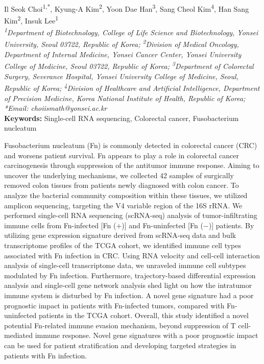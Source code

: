 \begin{center}
Il Seok Choi\textsuperscript{1,*}, Kyung-A Kim\textsuperscript{2}, Yoon Dae Han\textsuperscript{3}, Sang Cheol Kim\textsuperscript{4}, Han Sang Kim\textsuperscript{2}, Insuk Lee\textsuperscript{1} \\
\vspace{0.2cm}
\textit{\textsuperscript{1}Department of Biotechnology, College of Life Science and Biotechnology, Yonsei University, Seoul 03722, Republic of Korea; \textsuperscript{2}Division of Medical Oncology, Department of Internal Medicine, Yonsei Cancer Center, Yonsei University College of Medicine, Seoul 03722, Republic of Korea; \textsuperscript{3}Department of Colorectal Surgery, Severance Hospital, Yonsei University College of Medicine, Seoul, Republic of Korea; \textsuperscript{4}Division of Healthcare and Artificial Intelligence, Department of Precision Medicine, Korea National Institute of Health, Republic of Korea; *Email: choiismath@yonsei.ac.kr} \\
\vspace{0.2cm}
\textbf{Keywords:} Single-cell RNA sequencing, Colorectal cancer, Fusobacterium nucleatum
\end{center}

\noindent
Fusobacterium nucleatum (Fn) is commonly detected in colorectal cancer (CRC) and worsens patient survival. Fn appears to play a role in colorectal cancer carcinogenesis through suppression of the antitumor immune response. Aiming to uncover the underlying mechanisms, we collected 42 samples of surgically removed colon tissues from patients newly diagnosed with colon cancer. To analyze the bacterial community composition within these tissues, we utilized amplicon sequencing, targeting the V4 variable region of the 16S rRNA. We performed single-cell RNA sequencing (scRNA-seq) analysis of tumor-infiltrating immune cells from Fn-infected [Fn (+)] and Fn-uninfected [Fn (−)] patients. By utilizing gene expression signature derived from scRNA-seq data and bulk transcriptome profiles of the TCGA cohort, we identified immune cell types associated with Fn infection in CRC. Using RNA velocity and cell-cell interaction analysis of single-cell transcriptome data, we unraveled immune cell subtypes modulated by Fn infection. Furthermore, trajectory-based differential expression analysis and single-cell gene network analysis shed light on how the intratumor immune system is disturbed by Fn infection. A novel gene signature had a poor prognostic impact in patients with Fn-infected tumors, compared with Fn-uninfected patients in the TCGA cohort. Overall, this study identified a novel potential Fn-related immune evasion mechanism, beyond suppression of T cell-mediated immune response. Novel gene signatures with a poor prognostic impact can be used for patient stratification and developing targeted strategies in patients with Fn infection.
\newpage

